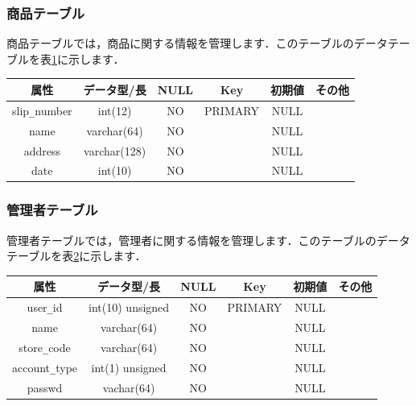 \documentclass[a4j,titlepage]{jarticle}
\begin{document}
\subsubsection{商品テーブル}
商品テーブルでは，商品に関する情報を管理します．このテーブルのデータテーブルを表\ref{goodsTable}に示します．
\begin{table}[htb]
  \label{goodsTable}
  \begin{center}
    \begin{tabular}{|c|c|c|c|c|c|} \hline
      属性 & データ型/長 & NULL & Key & 初期値 & その他 \\ \hline \hline
      slip\verb|_|number & int(12) & NO & PRIMARY  & NULL & \\ \hline
      name & varchar(64) & NO &   & NULL & \\ \hline
      address & varchar(128) & NO &   & NULL & \\ \hline
      date & int(10) & NO &   & NULL & \\ \hline
    \end{tabular}
  \end{center}
\end{table}

\subsubsection{管理者テーブル}
管理者テーブルでは，管理者に関する情報を管理します．このテーブルのデータテーブルを表\ref{managerTable}に示します．
\begin{table}[htb]
  \label{managerTable}
  \begin{center}
    \begin{tabular}{|c|c|c|c|c|c|} \hline
      属性 & データ型/長 & NULL & Key & 初期値 & その他 \\ \hline \hline
      user\verb|_|id & int(10) unsigned & NO & PRIMARY & NULL & \\ \hline
      name & varchar(64) & NO &   & NULL & \\ \hline
      store\verb|_|code & varchar(64) & NO &   & NULL & \\ \hline
      account\verb|_|type & int(1) unsigned & NO &   & NULL & \\ \hline
      passwd & vachar(64) & NO &   & NULL & \\ \hline
    \end{tabular}
  \end{center}
\end{table}
\end{document}
